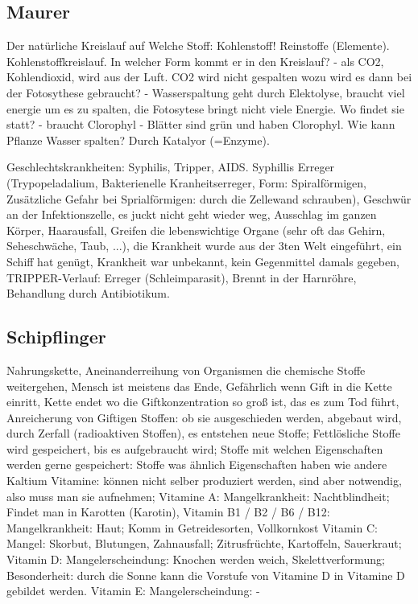 \documentclass[a4paper]{article}
\begin{document}
\subsection{Maurer}

Der natürliche Kreislauf auf Welche Stoff: Kohlenstoff! Reinstoffe (Elemente). Kohlenstoffkreislauf. In welcher Form kommt er in den Kreislauf? - als CO2, Kohlendioxid, wird aus der Luft. CO2 wird nicht gespalten wozu wird es dann bei der Fotosythese gebraucht? - Wasserspaltung geht durch Elektolyse, braucht viel energie um es zu spalten, die Fotosytese bringt nicht viele Energie. Wo findet sie statt? - braucht Clorophyl - Blätter sind grün und haben Clorophyl. Wie kann Pflanze Wasser spalten? Durch Katalyor (=Enzyme).

Geschlechtskrankheiten: Syphilis, Tripper, AIDS. Syphillis Erreger (Trypopeladalium, Bakterienelle Kranheitserreger, Form: Spiralförmigen, Zusätzliche Gefahr bei Sprialförmigen: durch die Zellewand schrauben), Geschwür an der Infektionszelle, es juckt nicht geht wieder weg, Ausschlag im ganzen Körper, Haarausfall, Greifen die lebenswichtige Organe (sehr oft das Gehirn, Seheschwäche, Taub, ...), die Krankheit wurde aus der 3ten Welt eingeführt, ein Schiff hat genügt, Krankheit war unbekannt, kein Gegenmittel damals gegeben,
TRIPPER-Verlauf: Erreger (Schleimparasit), Brennt in der Harnröhre,
Behandlung durch Antibiotikum.

\subsection{Schipflinger}

Nahrungskette, Aneinanderreihung von Organismen die chemische Stoffe weitergehen, Mensch ist meistens das Ende, Gefährlich wenn Gift in die Kette einritt, Kette endet wo die Giftkonzentration so groß ist, das es zum Tod führt, Anreicherung von Giftigen Stoffen: ob sie ausgeschieden werden, abgebaut wird, durch Zerfall (radioaktiven Stoffen), es entstehen neue Stoffe; Fettlösliche Stoffe wird gespeichert, bis es aufgebraucht wird; Stoffe mit welchen Eigenschaften werden gerne gespeichert: Stoffe was ähnlich Eigenschaften haben wie andere Kaltium
Vitamine: können nicht selber produziert werden, sind aber notwendig, also muss man sie aufnehmen; Vitamine A: Mangelkrankheit: Nachtblindheit; Findet man in Karotten (Karotin), Vitamin B1 / B2 / B6 / B12: Mangelkrankheit: Haut; Komm in Getreidesorten,  Vollkornkost
Vitamin C: Mangel: Skorbut, Blutungen, Zahnausfall; Zitrusfrüchte, Kartoffeln, Sauerkraut; Vitamin D: Mangelerscheindung: Knochen werden weich, Skelettverformung; Besonderheit: durch die Sonne kann die Vorstufe von Vitamine D in Vitamine D gebildet werden. Vitamin E: Mangelerscheindung: -
\end{document}
